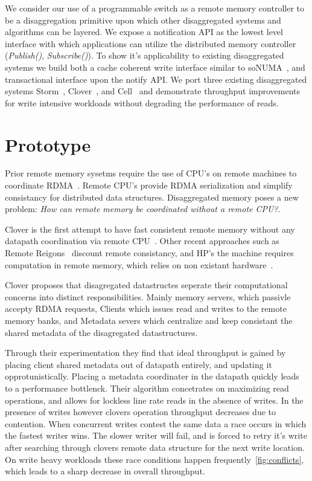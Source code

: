 We consider our use of a programmable switch as a remote memory
controller to be a disaggregation primitive upon which other
disaggregated systems and algorithms can be layered. We expose a
notification API as the lowest level interface with which applications
can utilize the distributed memory controller (\textit{Publish()},
\textit{Subscribe()}). To show it's applicability to existing
disaggregated systems we build both a cache coherent write interface
similar to soNUMA~\cite{sonuma}, and transactional interface upon the
notify API. We port three existing disaggregated systems
Storm~\cite{storm}, Clover~\cite{clover}, and Cell~\cite{cell} and
demonstrate throughput improvements for write intensive workloads
without degrading the performance of reads.


\section{Prototype}
Prior remote memory sysetms require the use of CPU's on remote
machines to coordinate RDMA~\cite{cell,sonuma,storm,erpc,farm}. Remote
CPU's provide RDMA serialization and simplify consistancy for
distributed data structures. Disaggregated memory poses a new problem:
\textit{How can remote memory be coordinated without a remote CPU?}.

Clover is the first attempt to have fast consistent remote memory
without any datapath coordination via remote CPU~\cite{clover}. Other
recent approaches such as Remote Reigons~\cite{reigons} discount
remote consistancy, and HP's the machine requires computation in
remote memory, which relies on non existant
hardware~\cite{aguilera2019designing}.

Clover proposes that disagregated datastructes seperate their
computational concerns into distinct responsibilities. Mainly memory
servers, which passivle accepty RDMA requests, Clients which issues read and
writes to the remote memory banks, and Metadata severs which
centralize and keep consistant the shared metadata of the disagregated
datastructures.

Through their experimentation they find that ideal throughput is
gained by placing client shared metadata out of datapath entirely, and
updating it opprotunistically. Placing a metadata coordinater in the
datapath quickly leads to a performance bottlenck. Their algorithm
concetrates on maximizing read operations, and allows for lockless
line rate reads in the absence of writes. In the presence of writes
however clovers operation throughput decreases due to contention. When
concurrent writes contest the same data a race occurs in which the
fastest writer wins. The slower writer will fail, and is forced to
retry it's write after searching through clovers remote data structure
for the next write location. On write heavy workloads these race
conditions happen frequently~\ref{fig:conflicts}, which leads to a
sharp decrease in overall throughput.

